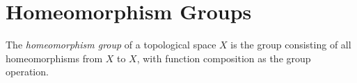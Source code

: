 \section{Homeomorphism Groups}

  \begin{definition}
    The \textit{homeomorphism group} of a topological space $X$ is the group consisting of all homeomorphisms from $X$ to $X$, with function composition as the group operation.
    \end{definition}


